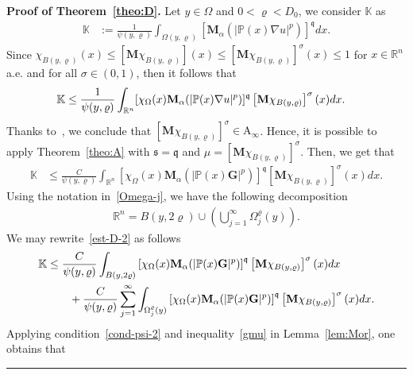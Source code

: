 \documentclass[a4paper, 11pt]{article}
\newenvironment{proof}[1][Proof]{\textbf{#1.} }{\hfill\rule{0.5em}{0.5em}}
\begin{document}
\begin{proof}[Proof of Theorem~\ref{theo:D}]
Let $y \in \Omega$ and $0<\varrho<D_0$, we consider $\mathbb{K}$ as
\begin{align*}
\mathbb{K} & := \frac{1}{\psi(y,\varrho)}\int_{\Omega(y,\varrho)}[\mathbf{M}_{\alpha}(|\mathbb{P}(x)\nabla u|^{p})]^{\mathfrak{q}}dx.
\end{align*}
Since $\chi_{B(y,\varrho)}(x) \le \left[\mathbf{M} \chi_{B(y,\varrho)}\right](x) \le \left[\mathbf{M} \chi_{B(y,\varrho)}\right]^{\sigma}(x) \le 1$ for $x \in \mathbb{R}^n$ a.e. and for all $\sigma \in (0,1)$, then it follows that
\begin{align}\notag %
\mathbb{K}  & \le \frac{1}{\psi(y,\varrho)} \int_{\mathbb{R}^n}[\chi_{\Omega}(x)\mathbf{M}_{\alpha}(|\mathbb{P}(x)\nabla u|^{p})]^{\mathfrak{q}} \left[\mathbf{M} \chi_{B(y,\varrho)}\right]^{\sigma}(x) dx.
\end{align}
Thanks to~\cite[Proposition 2]{CR80}, we conclude that $\left[\mathbf{M} \chi_{B(y,\varrho)}\right]^{\sigma} \in \mathrm{A}_{\infty}$. Hence, it is possible to apply Theorem~\ref{theo:A} with $\mathfrak{s}=\mathfrak{q}$ and $\mu = \left[\mathbf{M} \chi_{B(y,\varrho)}\right]^{\sigma}$. Then, we get that
\begin{align}\label{est-D-2}
\mathbb{K} & \le \frac{C}{\psi(y,\varrho)} \int_{\mathbb{R}^n} \left[\chi_{\Omega}(x)\mathbf{M}_{\alpha}(|\mathbb{P}(x)\mathbf{G}|^{p})\right]^{\mathfrak{q}} \left[\mathbf{M} \chi_{B(y,\varrho)}\right]^{\sigma}(x) dx.
\end{align}
Using the notation in~\eqref{Omega-j}, we have the following decomposition
\begin{align*}
\mathbb{R}^n = B(y,2\varrho) \cup \left(\bigcup_{j=1}^{\infty} \Omega_{j}^{\varrho}(y) \right).
\end{align*}
We may rewrite~\eqref{est-D-2} as follows
\begin{align} %
\mathbb{K} & \le \frac{C}{\psi(y,\varrho)}\int_{B(y,2\varrho)} \left[\chi_{\Omega}(x)\mathbf{M}_{\alpha}(|\mathbb{P}(x)\mathbf{G}|^{p})\right]^{\mathfrak{q}} \left[\mathbf{M} \chi_{B(y,\varrho)}\right]^{\sigma}(x) dx \notag \\
& \qquad + \frac{C}{\psi(y,\varrho)} \sum_{j=1}^{\infty}\int_{\Omega_{j}^{\varrho}(y)} \left[\chi_{\Omega}(x)\mathbf{M}_{\alpha}(|\mathbb{P}(x)\mathbf{G}|^{p})\right]^{\mathfrak{q}} \left[\mathbf{M} \chi_{B(y,\varrho)}\right]^{\sigma}(x) dx.\notag
\end{align}
Applying condition~\eqref{cond-psi-2} and inequality~\eqref{gmu} in Lemma~\ref{lem:Mor}, one obtains that

\end{proof}
\end{document}
